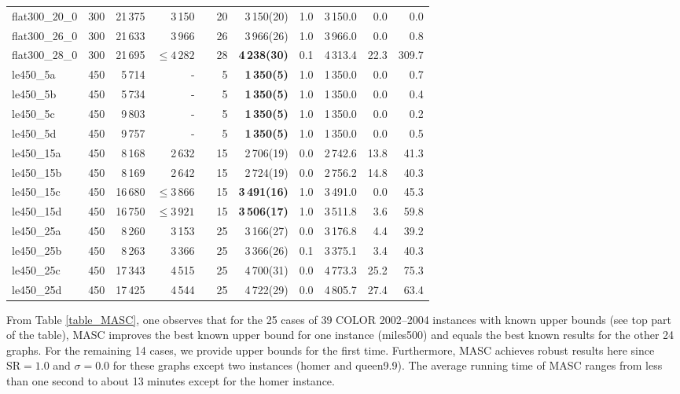 \documentclass{elsart}
\begin{document}
\begin{table}
\begin{scriptsize}
\begin{tabular}{lrrrcrrrrrr}
flat300\_20\_0    & 300 & 21\,375 & 3\,150 &&20& 3\,150(20) &1.0& 3\,150.0&0.0 & 0.0 \\
flat300\_26\_0    & 300 & 21\,633 & 3\,966 &&26& 3\,966(26) &1.0& 3\,966.0&0.0 & 0.8 \\
flat300\_28\_0    & 300 & 21\,695 &  $\le 4\,282$ &&28&  \textbf{4\,238(30)} &0.1& 4\,313.4&22.3 & 309.7 \\
le450\_5a    & 450 & 5\,714  &-  &&5&\textbf{1\,350(5)}  &1.0& 1\,350.0 &0.0 & 0.7  \\
le450\_5b    & 450 & 5\,734  &-  &&5&\textbf{1\,350(5)}   &1.0& 1\,350.0 &0.0 & 0.4  \\
le450\_5c    & 450 & 9\,803  &-  &&5&\textbf{1\,350(5)}   &1.0& 1\,350.0 &0.0 & 0.2  \\
le450\_5d    & 450 & 9\,757  &-  &&5&\textbf{1\,350(5)}   &1.0& 1\,350.0 &0.0 & 0.5  \\
le450\_15a    & 450 & 8\,168  &2\,632 &&15&2\,706(19)  &0.0& 2\,742.6&13.8 & 41.3  \\
le450\_15b    & 450 & 8\,169 & 2\,642  &&15& 2\,724(19) &0.0& 2\,756.2&14.8 & 40.3 \\
le450\_15c    & 450 & 16\,680 & $\le 3\,866$ &&15& \textbf{3\,491(16)} &1.0& 3\,491.0&0.0 & 45.3  \\
le450\_15d    & 450 & 16\,750 &  $\le 3\,921$ &&15&  \textbf{3\,506(17)} &1.0& 3\,511.8&3.6 &59.8 \\
le450\_25a    & 450 & 8\,260 &3\,153 &&25&3\,166(27) &0.0& 3\,176.8&4.4 & 39.2 \\
le450\_25b    & 450 & 8\,263 & 3\,366 &&25& 3\,366(26) &0.1& 3\,375.1&3.4 & 40.3 \\
le450\_25c    & 450 & 17\,343 & 4\,515  &&25& 4\,700(31) &0.0& 4\,773.3&25.2 & 75.3  \\
le450\_25d    & 450 & 17\,425 & 4\,544 &&25& 4\,722(29) &0.0& 4\,805.7&27.4 & 63.4  \\
\hline
\end{tabular}
\end{scriptsize}
\end{table}
\renewcommand{\baselinestretch}{1.0}\large\normalsize


From Table \ref{table_MASC}, one observes that for the 25 cases of 39 COLOR 2002--2004 instances with known upper bounds (see top part of the table), MASC improves the best known upper bound for one instance (miles500) and equals the best known results for the other 24 graphs. For the remaining 14 cases, we provide upper bounds for the first time. Furthermore, MASC achieves robust results here since $\textrm{SR} = 1.0$ and $\sigma = 0.0$ for these graphs except two instances (homer and queen9.9). The average running time of MASC ranges from less than one second to about 13 minutes except for the homer instance.
\end{document}
